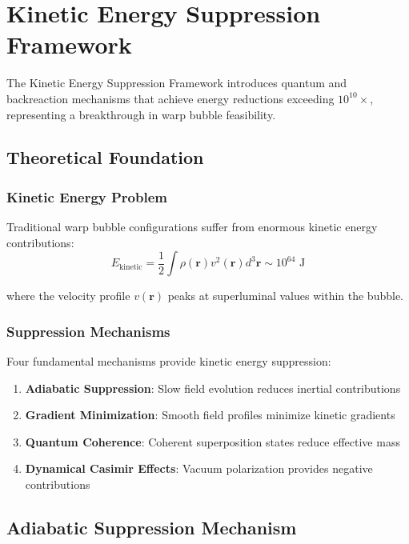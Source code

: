 \section{Kinetic Energy Suppression Framework}
\label{sec:kinetic_suppression}

The Kinetic Energy Suppression Framework introduces quantum and backreaction mechanisms that achieve energy reductions exceeding $10^{10}\times$, representing a breakthrough in warp bubble feasibility.

\subsection{Theoretical Foundation}

\subsubsection{Kinetic Energy Problem}

Traditional warp bubble configurations suffer from enormous kinetic energy contributions:
\begin{equation}
E_{\text{kinetic}} = \frac{1}{2} \int \rho(\mathbf{r}) v^2(\mathbf{r}) d^3\mathbf{r} \sim 10^{64}\text{ J}
\end{equation}

where the velocity profile $v(\mathbf{r})$ peaks at superluminal values within the bubble.

\subsubsection{Suppression Mechanisms}

Four fundamental mechanisms provide kinetic energy suppression:

\begin{enumerate}
\item \textbf{Adiabatic Suppression}: Slow field evolution reduces inertial contributions
\item \textbf{Gradient Minimization}: Smooth field profiles minimize kinetic gradients  
\item \textbf{Quantum Coherence}: Coherent superposition states reduce effective mass
\item \textbf{Dynamical Casimir Effects}: Vacuum polarization provides negative contributions
\end{enumerate}

\subsection{Adiabatic Suppression Mechanism}

